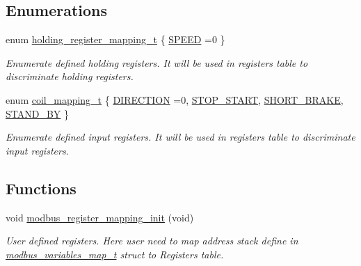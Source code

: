 \subsection*{Enumerations}
\begin{DoxyCompactItemize}
\item 
enum \mbox{\hyperlink{group___insert_ga437be52e6b8688da8c4a21cd5adc7562}{holding\+\_\+register\+\_\+mapping\+\_\+t}} \{ \mbox{\hyperlink{group___insert_gga437be52e6b8688da8c4a21cd5adc7562a1fb3554200c1173d24e97e9d32283ead}{S\+P\+E\+ED}} =0
 \}
\begin{DoxyCompactList}\small\item\em Enumerate defined holding registers. It will be used in registers table to discriminate holding registers. \end{DoxyCompactList}\item 
enum \mbox{\hyperlink{group___insert_ga99c131df24fe52208d5876ebb4808cd1}{coil\+\_\+mapping\+\_\+t}} \{ \mbox{\hyperlink{group___insert_gga99c131df24fe52208d5876ebb4808cd1a29e2c300ecd12ceecf4ab3fb87bbdafc}{D\+I\+R\+E\+C\+T\+I\+ON}} =0, 
\mbox{\hyperlink{group___insert_gga99c131df24fe52208d5876ebb4808cd1a17a86e62cb56446d7cb9f48986916c8c}{S\+T\+O\+P\+\_\+\+S\+T\+A\+RT}}, 
\mbox{\hyperlink{group___insert_gga99c131df24fe52208d5876ebb4808cd1a14bfb8b42ecf3582715ef668c081565d}{S\+H\+O\+R\+T\+\_\+\+B\+R\+A\+KE}}, 
\mbox{\hyperlink{group___insert_gga99c131df24fe52208d5876ebb4808cd1ade341e96f0b0486907ed22ec39faa0c3}{S\+T\+A\+N\+D\+\_\+\+BY}}
 \}
\begin{DoxyCompactList}\small\item\em Enumerate defined input registers. It will be used in registers table to discriminate input registers. \end{DoxyCompactList}\end{DoxyCompactItemize}
\subsection*{Functions}
\begin{DoxyCompactItemize}
\item 
void \mbox{\hyperlink{group___insert_ga6dbaaf108ca00d5dfd1037aadfc10f6f}{modbus\+\_\+register\+\_\+mapping\+\_\+init}} (void)
\begin{DoxyCompactList}\small\item\em User defined registers. Here user need to map address stack define in \mbox{\hyperlink{structmodbus__variables__map__t}{modbus\+\_\+variables\+\_\+map\+\_\+t}} struct to Registers table. \end{DoxyCompactList}\end{DoxyCompactItemize}
